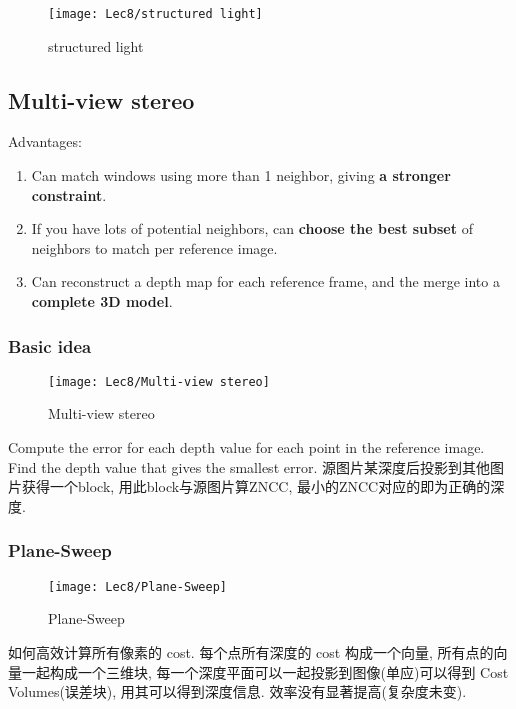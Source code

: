 \begin{figure}[H]
    \centering
    \texttt{[image: Lec8/structured light]}
    \caption{structured light}
\end{figure}

\subsection{Multi-view stereo}

Advantages: 
\begin{enumerate}
    \item Can match windows using more than 1 neighbor, giving \textbf{a stronger constraint}.
    \item If you have lots of potential neighbors, can \textbf{choose the best subset} of neighbors to match per reference image.
    \item Can reconstruct a depth map for each reference frame, and the merge into a \textbf{complete 3D model}.
\end{enumerate}

\subsubsection{Basic idea}

\begin{figure}[H]
    \centering
    \texttt{[image: Lec8/Multi-view stereo]}
    \caption{Multi-view stereo}
\end{figure}

Compute the error for each depth value for each point in the reference image. Find the depth value that gives the smallest error. 源图片某深度后投影到其他图片获得一个block, 用此block与源图片算ZNCC, 最小的ZNCC对应的即为正确的深度. 

\subsubsection{Plane-Sweep}

\begin{figure}[H]
    \centering
    \texttt{[image: Lec8/Plane-Sweep]}
    \caption{Plane-Sweep}
\end{figure}

如何高效计算所有像素的 cost. 每个点所有深度的 cost 构成一个向量, 所有点的向量一起构成一个三维块, 每一个深度平面可以一起投影到图像(单应)可以得到 Cost Volumes(误差块), 用其可以得到深度信息. 效率没有显著提高(复杂度未变). 

